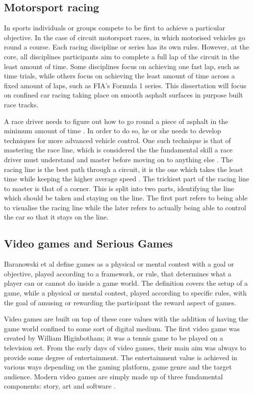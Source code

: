\documentclass{article}
\begin{document}
\subsection{Motorsport racing}

In sports individuals or groups compete to be first to achieve a particular objective. In the case of circuit motorsport races, in which motorised vehicles go round a course. Each racing discipline or series has its own rules. However, at the core, all disciplines participants aim to complete a full lap of the circuit in the least amount of time. Some disciplines focus on achieving one fast lap, such as time trials, while others focus on achieving the least amount of time across a fixed amount of laps, such as FIA's Formula 1 series. This dissertation will focus on confined car racing taking place on smooth asphalt surfaces in purpose built race tracks. 

A race driver needs to figure out how to go round a piece of asphalt in the minimum amount of time \cite{GoingFaster}. In order to do so, he or she needs to develop techniques for more advanced vehicle control. One such technique is that of mastering the race line, which is considered the the fundamental skill a race driver must understand and master before moving on to anything else \cite{GoingFaster}. The racing line is the best path through a circuit, it is the one which takes the least time while keeping the higher average speed \cite{beckman1991physics}. The trickiest part of the racing line to master is that of a corner. This is split into two parts, identifying the line which should be taken and staying on the line. The first part refers to being able to visualise the racing line while the later refers to actually being able to control the car so that it stays on the line. 

\subsection{Video games and Serious Games}

Baranowski et al \cite{yuserious} define games as a physical or mental contest with a goal or objective, played according to a framework, or rule, that determines what a player can or cannot do inside a game world. The definition covers the setup of a game, while a physical or mental contest, played according to specific rules, with the goal of amusing or rewarding the participant the reward aspect of games.

Video games are built on top of these core values with the addition of having the game world confined to some sort of digital medium. The first video game was created by William Higinbotham; it was a tennis game to be played on a television set\cite{stanton2015brief}. From the early days of video games, their main aim was always to provide some degree of entertainment. The entertainment value is achieved in various ways depending on the gaming platform, game genre and the target audience. Modern video games are simply made up of three fundamental components: story, art and software \cite{zyda2005visual}.
\end{document}
